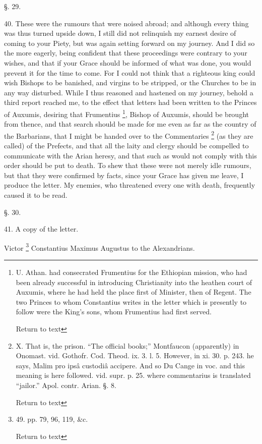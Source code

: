 §. 29.

40. These were the rumours that were noised abroad; and although every
thing was thus turned upside down, I still did not relinquish my
earnest desire of coming to your Piety, but was again setting forward
on my journey. And I did so the more eagerly, being confident that
these proceedings were contrary to your wishes, and that if your Grace
should be informed of what was done, you would prevent it for the time
to come. For I could not think that a righteous king could wish
Bishops to be banished, and virgins to be stripped, or the Churches to
be in any way disturbed. While I thus reasoned and hastened on my
journey, behold a third report reached me, to the effect that letters
had been written to the Princes of Auxumis, desiring that Frumentius \footnote{U. Athan. had consecrated Frumentius for the Ethiopian mission, who had
been already successful in introducing Christianity into the heathen
court of Auxumis, where he had held the place first of Minister, then
of Regent. The two Princes to whom Constantius writes in the letter
which is presently to follow were the King's sons, whom Frumentius had
first served.

Return to text}, Bishop of Auxumis, should be brought from thence, and that
search should be made for me even as far as the country of the
Barbarians, that I might be handed over to the Commentaries \footnote{X. That is, the prison. ``The official books;'' Montfaucon (apparently) in
Onomast. vid. Gothofr. Cod. Theod. ix. 3. l. 5. However, in xi. 30. p.
243. he says, Malim pro ipsâ custodiâ accipere. And so Du Cange in
voc. and this meaning is here followed. vid. supr. p. 25. where
commentarius is translated ``jailor.'' Apol. contr. Arian. §. 8.

Return to text} (as they are called) of the Prefects, and that all the
laity and clergy should be compelled to communicate with the Arian
heresy, and that such as would not comply with this order should be
put to death. To shew that these were not merely idle rumours, but
that they were confirmed by facts, since your Grace has given me
leave, I produce the letter. My enemies, who threatened every one with
death, frequently caused it to be read.

§. 30.

41. A copy of the letter.

Victor \footnote{49. pp. 79, 96, 119, \&c.

Return to text} Constantius
Maximus Augustus to the Alexandrians.


